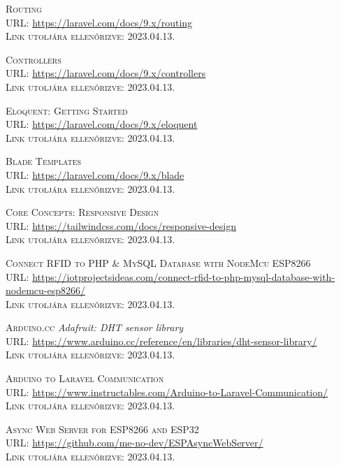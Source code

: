 \documentclass[
]{thesis-ekf}
\theoremstyle{definition}
\theoremstyle{remark}
\begin{document}
\begin{thebibliography}{46}
		\textsc{Routing}\\
		\textsc{URL:} \url{https://laravel.com/docs/9.x/routing}\\
		\textsc{Link utoljára ellenőrizve:} 2023.04.13.
		
		\textsc{Controllers}\\
		\textsc{URL:} \url{https://laravel.com/docs/9.x/controllers}\\
		\textsc{Link utoljára ellenőrizve:} 2023.04.13.
		
		\textsc{Eloquent: Getting Started}\\
		\textsc{URL:} \url{https://laravel.com/docs/9.x/eloquent}\\
		\textsc{Link utoljára ellenőrizve:} 2023.04.13.
		
		\textsc{Blade Templates}\\
		\textsc{URL:} \url{https://laravel.com/docs/9.x/blade}\\
		\textsc{Link utoljára ellenőrizve:} 2023.04.13.
		
		\textsc{Core Concepts: Responsive Design}\\
		\textsc{URL:} \url{https://tailwindcss.com/docs/responsive-design}\\
		\textsc{Link utoljára ellenőrizve:} 2023.04.13.
		
		\textsc{Connect RFID to PHP \& MySQL Database with NodeMcu ESP8266}\\
		\textsc{URL:} \url{https://iotprojectsideas.com/connect-rfid-to-php-mysql-database-with-nodemcu-esp8266/}\\
		\textsc{Link utoljára ellenőrizve:} 2023.04.13.
		
		\textsc{Arduino.cc} \emph{Adafruit: DHT sensor library}\\
		\textsc{URL:} \url{https://www.arduino.cc/reference/en/libraries/dht-sensor-library/}\\
		\textsc{Link utoljára ellenőrizve:} 2023.04.13.
		
		\textsc{Arduino to Laravel Communication}\\
		\textsc{URL:} \url{https://www.instructables.com/Arduino-to-Laravel-Communication/}\\
		\textsc{Link utoljára ellenőrizve:} 2023.04.13.
		
		\textsc{Async Web Server for ESP8266 and ESP32}\\
		\textsc{URL:} \url{https://github.com/me-no-dev/ESPAsyncWebServer/}\\
		\textsc{Link utoljára ellenőrizve:} 2023.04.13.
		

\end{thebibliography}
\end{document}
